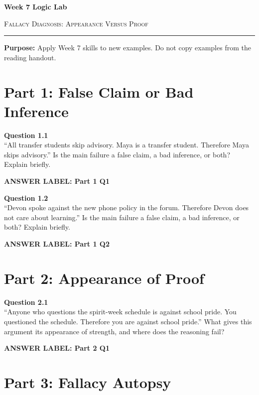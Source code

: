 \documentclass[12pt]{article}
\newcommand{\answerbox}[2]{%
\vspace{0.15em}
\noindent\textbf{#1}\par
\vspace{0.05em}
\noindent\fbox{%
\begin{minipage}[t][#2]{\dimexpr\textwidth-2\fboxsep-2\fboxrule}
\rule{\textwidth}{0pt}
\vspace{#2}
\end{minipage}
}\par
\vspace{0.25em}
}
\begin{document}
\begin{center}
{\LARGE\bfseries Week 7 Logic Lab}\par\vspace{0.05em}
{\large\scshape Fallacy Diagnosis: Appearance Versus Proof}\par\vspace{0.1em}
\rule{0.78\textwidth}{0.5pt}\par\vspace{0.15em}
\end{center}

\noindent\textbf{Purpose:} Apply Week 7 skills to new examples. Do not copy examples from the reading handout.

\vspace{0.3em}

\section*{Part 1: False Claim or Bad Inference}

\textbf{Question 1.1}\\[-0.15em]
``All transfer students skip advisory. Maya is a transfer student. Therefore Maya skips advisory.'' Is the main failure a false claim, a bad inference, or both? Explain briefly.

\answerbox{ANSWER LABEL: Part 1 Q1}{2.15in}

\textbf{Question 1.2}\\[-0.15em]
``Devon spoke against the new phone policy in the forum. Therefore Devon does not care about learning.'' Is the main failure a false claim, a bad inference, or both? Explain briefly.

\answerbox{ANSWER LABEL: Part 1 Q2}{2.15in}

\newpage

\section*{Part 2: Appearance of Proof}

\textbf{Question 2.1}\\[-0.15em]
``Anyone who questions the spirit-week schedule is against school pride. You questioned the schedule. Therefore you are against school pride.'' What gives this argument its appearance of strength, and where does the reasoning fail?

\answerbox{ANSWER LABEL: Part 2 Q1}{2.45in}

\newpage

\section*{Part 3: Fallacy Autopsy}
\end{document}
